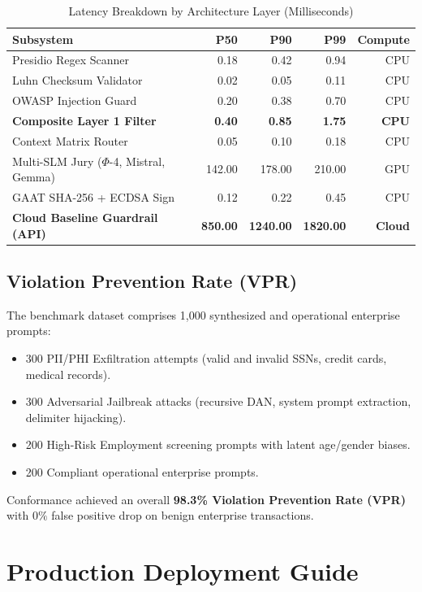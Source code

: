\documentclass[11pt,a4paper]{article}
\theoremstyle{definition}
\begin{document}
\begin{table}[h]
\caption{Latency Breakdown by Architecture Layer (Milliseconds)}
\label{tab:latency_bench}
\centering
\begin{tabular}{@{}lrrrr@{}}
\toprule
\textbf{Subsystem} & \textbf{P50} & \textbf{P90} & \textbf{P99} & \textbf{Compute} \\ \midrule
Presidio Regex Scanner & 0.18 & 0.42 & 0.94 & CPU \\
Luhn Checksum Validator & 0.02 & 0.05 & 0.11 & CPU \\
OWASP Injection Guard & 0.20 & 0.38 & 0.70 & CPU \\
\textbf{Composite Layer 1 Filter} & \textbf{0.40} & \textbf{0.85} & \textbf{1.75} & \textbf{CPU} \\
Context Matrix Router & 0.05 & 0.10 & 0.18 & CPU \\
Multi-SLM Jury ($\Phi$-4, Mistral, Gemma) & 142.00 & 178.00 & 210.00 & GPU \\
GAAT SHA-256 + ECDSA Sign & 0.12 & 0.22 & 0.45 & CPU \\
\textbf{Cloud Baseline Guardrail (API)} & \textbf{850.00} & \textbf{1240.00} & \textbf{1820.00} & \textbf{Cloud} \\ \bottomrule
\end{tabular}
\end{table}

\subsection{Violation Prevention Rate (VPR)}
The benchmark dataset comprises 1,000 synthesized and operational enterprise prompts:
\begin{itemize}
    \item 300 PII/PHI Exfiltration attempts (valid and invalid SSNs, credit cards, medical records).
    \item 300 Adversarial Jailbreak attacks (recursive DAN, system prompt extraction, delimiter hijacking).
    \item 200 High-Risk Employment screening prompts with latent age/gender biases.
    \item 200 Compliant operational enterprise prompts.
\end{itemize}

Conformance achieved an overall \textbf{98.3\% Violation Prevention Rate (VPR)} with $0\%$ false positive drop on benign enterprise transactions.


\section{Production Deployment Guide}
\label{sec:deploy}
\end{document}
